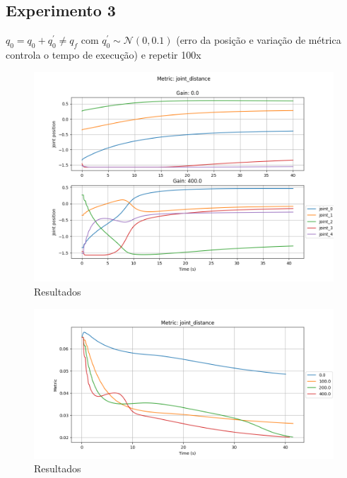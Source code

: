 \subsection*{Experimento 3}
$q_0 = q_0 + q_0^\prime \neq q_f$ com $q_0^\prime \sim \mathcal{N}(0, 0.1)$ (erro da posição e variação de métrica
controla o tempo de execução) e repetir 100x

\begin{figure}
    \centering
    \includegraphics[width=1.0\textwidth]{Images/joint_distance/joint_states_joint_distance.png}
    \caption{Resultados}\label{fig:jd-js}
\end{figure}

\begin{figure}
    \centering
    \includegraphics[width=1.0\textwidth]{Images/joint_distance/metric_joint_distance.png}
    \caption{Resultados}\label{fig:jd-m}
\end{figure}

